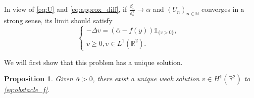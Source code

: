 \documentclass[10pt,a4paper]{article}
\newcommand{\NN}{\mathbb{N}}
\newcommand{\RR}{\mathbb{R}}
\newtheorem{prop}[thm]{Proposition}
\numberwithin{equation}{section}
\begin{document}
In view of \eqref{eq:U} and \eqref{eq:approx_diff}, if $ \frac{\beta_n}{\varepsilon_n^{\gamma}}\rightarrow \overline{\alpha} $ and $ (U_n)_{n\in\NN} $ converges in a strong sense, its limit should satisfy
\begin{equation}
\label{eq:obstacle_f}
	\begin{cases}
		-\Delta v = \left(\overline{\alpha} - f(y)  \right) \mathbb{1}_{\{v > 0\}}, \\
		v \geq 0, v\in L^{1}(\RR^{2}).
	\end{cases}
\end{equation}

We will first show that this problem has a unique solution.
\begin{prop}
	\label{prop:existence}
	Given $ \overline{\alpha} > 0 $, there exist a unique weak solution $ v \in H^{1}(\RR^{2}) $ to \eqref{eq:obstacle_f}.
\end{prop}
\end{document}
